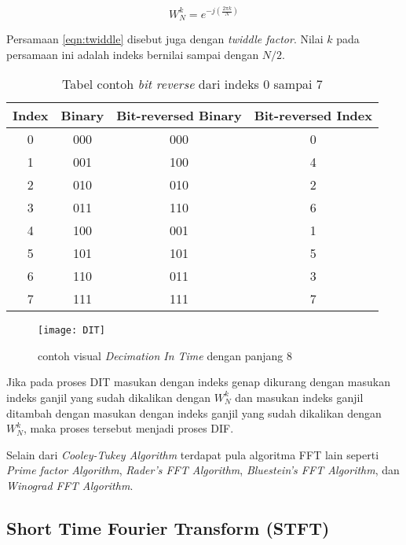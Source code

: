 \begin{equation}\label{eqn:twiddle}
	W^k_N = e^{-j(\frac{2\pi k}{N})} 
\end{equation}

Persamaan \ref{eqn:twiddle} disebut juga dengan {\it twiddle factor}. Nilai $k$ pada persamaan ini adalah indeks bernilai sampai dengan $N/2$. 


\begin{table}[H]
	\label{tab:bitreverse}
	\centering
	\begin{tabular}{|c|c|c|c|}
	\hline	Index & Binary & Bit-reversed Binary & Bit-reversed Index\\
	\hline 0	& 000 & 000 & 0 \\
	\hline 1	& 001 & 100 & 4 \\
	\hline 2	& 010 & 010 & 2 \\
	\hline 3	& 011 & 110 & 6 \\
	\hline 4	& 100 & 001 & 1 \\
	\hline 5	& 101 & 101 & 5 \\
	\hline 6	& 110 & 011 & 3 \\
	\hline 7	& 111 & 111 & 7 \\
	\hline
	\end{tabular}
	\caption{Tabel contoh {\it bit reverse} dari indeks 0 sampai 7 }
\end{table}
\begin{figure} [H]
	\centering  
	\texttt{[image: DIT]}  
	\caption[contoh visual {\it Decimation In Time} dengan panjang 8 ]{contoh visual {\it Decimation In Time} dengan panjang 8} 
	\label{fig:DIT} 
\end{figure} 

Jika pada proses DIT masukan dengan indeks genap dikurang dengan masukan indeks ganjil yang sudah dikalikan dengan $W^k_N$ dan masukan indeks ganjil ditambah dengan masukan dengan indeks ganjil yang sudah dikalikan dengan $W^k_N$, maka proses tersebut menjadi proses DIF.

Selain dari {\it Cooley-Tukey Algorithm} terdapat pula algoritma FFT lain seperti {\it Prime factor Algorithm}, {\it Rader's FFT Algorithm}, {\it Bluestein's FFT Algorithm}, dan {\it Winograd FFT Algorithm}.

\subsection{Short Time Fourier Transform (STFT) \cite{alan:0:dtsp}}
\label{subsec:stft}
  

